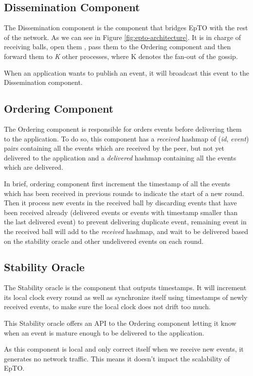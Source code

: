 \documentclass[10pt,conference,a4paper]{IEEEtran}
\begin{document}
\subsection{Dissemination Component}
The Dissemination component is the component that bridges EpTO with the rest of the network. As we can see in Figure \ref*{fig:epto-architecture}. It is in charge of receiving balls, open them , pass them to the Ordering component and then forward them to \textit{K} other processes, where K denotes the fan-out of the gossip.
\par
When an application wants to publish an event, it will broadcast this event to the Dissemination component.

\subsection{Ordering Component}
The Ordering component is responsible for orders events before delivering them to the application.
To do so, this component has a \textit{received} hashmap of (\textit{id}, \textit{event}) pairs containing all the events which are received by the peer, but not yet delivered to the application and a \textit{delivered} hashmap containing all the events which are delivered.
\par
In brief, ordering component first increment the timestamp of all the events which has been received in previous rounds to indicate the start of a new round. Then it process new events in the received ball by discarding events that have been received already (delivered events or events with timestamp smaller than the last delivered event) to prevent delivering duplicate event, remaining event in the received ball will add to the \textit{received} hashmap, and wait to be delivered based on the stability oracle and other undelivered events on each round.
\subsection{Stability Oracle}
The Stability oracle is the component that outputs timestamps. It will increment its local clock every round as well as synchronize itself using timestamps of newly received events, to make sure the local clock does not drift too much.
\par
This Stability oracle offers an API to the Ordering component letting it know when an event is mature enough to be delivered to the application.
\par
As this component is local and only correct itself when we receive new events, it generates no network traffic. This means it doesn't impact the scalability of EpTO.
\end{document}

